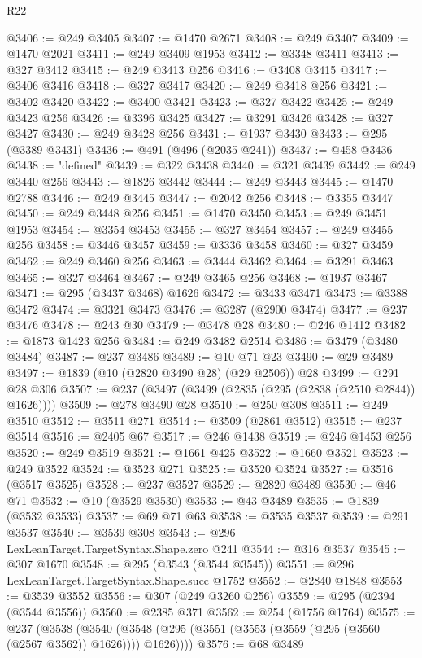 \begin{lexlean}{R22}
\begin{coremodule}
@3406 := @249 @3405
@3407 := @1470 @2671
@3408 := @249 @3407
@3409 := @1470 @2021
@3411 := @249 @3409 @1953
@3412 := @3348 @3411
@3413 := @327 @3412
@3415 := @249 @3413 @256
@3416 := @3408 @3415
@3417 := @3406 @3416
@3418 := @327 @3417
@3420 := @249 @3418 @256
@3421 := @3402 @3420
@3422 := @3400 @3421
@3423 := @327 @3422
@3425 := @249 @3423 @256
@3426 := @3396 @3425
@3427 := @3291 @3426
@3428 := @327 @3427
@3430 := @249 @3428 @256
@3431 := @1937 @3430
@3433 := @295 (@3389 @3431)
@3436 := @491 (@496 (@2035 @241))
@3437 := @458 @3436
@3438 := "defined"
@3439 := @322 @3438
@3440 := @321 @3439
@3442 := @249 @3440 @256
@3443 := @1826 @3442
@3444 := @249 @3443
@3445 := @1470 @2788
@3446 := @249 @3445
@3447 := @2042 @256
@3448 := @3355 @3447
@3450 := @249 @3448 @256
@3451 := @1470 @3450
@3453 := @249 @3451 @1953
@3454 := @3354 @3453
@3455 := @327 @3454
@3457 := @249 @3455 @256
@3458 := @3446 @3457
@3459 := @3336 @3458
@3460 := @327 @3459
@3462 := @249 @3460 @256
@3463 := @3444 @3462
@3464 := @3291 @3463
@3465 := @327 @3464
@3467 := @249 @3465 @256
@3468 := @1937 @3467
@3471 := @295 (@3437 @3468) @1626
@3472 := @3433 @3471
@3473 := @3388 @3472
@3474 := @3321 @3473
@3476 := @3287 (@2900 @3474)
@3477 := @237 @3476
@3478 := @243 @30
@3479 := @3478 @28
@3480 := @246 @1412
@3482 := @1873 @1423 @256
@3484 := @249 @3482 @2514
@3486 := @3479 (@3480 @3484)
@3487 := @237 @3486
@3489 := @10 @71 @23
@3490 := @29 @3489
@3497 := @1839 (@10 (@2820 @3490 @28) (@29 @2506)) @28
@3499 := @291 @28 @306
@3507 := @237 (@3497 (@3499 (@2835 (@295 (@2838 (@2510 @2844)) @1626))))
@3509 := @278 @3490 @28
@3510 := @250 @308
@3511 := @249 @3510
@3512 := @3511 @271
@3514 := @3509 (@2861 @3512)
@3515 := @237 @3514
@3516 := @2405 @67
@3517 := @246 @1438
@3519 := @246 @1453 @256
@3520 := @249 @3519
@3521 := @1661 @425
@3522 := @1660 @3521
@3523 := @249 @3522
@3524 := @3523 @271
@3525 := @3520 @3524
@3527 := @3516 (@3517 @3525)
@3528 := @237 @3527
@3529 := @2820 @3489
@3530 := @46 @71
@3532 := @10 (@3529 @3530)
@3533 := @43 @3489
@3535 := @1839 (@3532 @3533)
@3537 := @69 @71 @63
@3538 := @3535 @3537
@3539 := @291 @3537
@3540 := @3539 @308
@3543 := @296 LexLeanTarget.TargetSyntax.Shape.zero @241
@3544 := @316 @3537
@3545 := @307 @1670
@3548 := @295 (@3543 (@3544 @3545))
@3551 := @296 LexLeanTarget.TargetSyntax.Shape.succ @1752
@3552 := @2840 @1848
@3553 := @3539 @3552
@3556 := @307 (@249 @3260 @256)
@3559 := @295 (@2394 (@3544 @3556))
@3560 := @2385 @371
@3562 := @254 (@1756 @1764)
@3575 := @237
    (@3538 (@3540 (@3548 (@295 (@3551 (@3553 (@3559 (@295 (@3560 (@2567 @3562)) @1626)))) @1626))))
@3576 := @68 @3489

\end{coremodule}
\end{lexlean}
